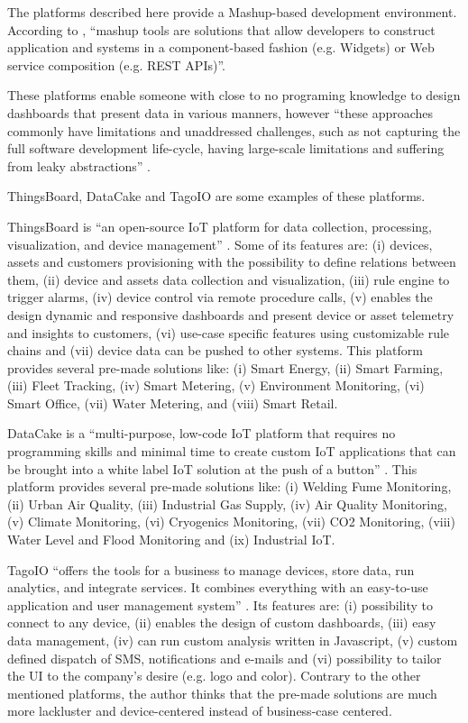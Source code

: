 The platforms described here provide a Mashup-based development environment. According to \cite{DIAS2022100529}, ``mashup tools are solutions that allow developers to construct application and systems in a component-based fashion (e.g. Widgets) or Web service composition (e.g. REST APIs)''.

These platforms enable someone with close to no programing knowledge to design dashboards that present data in various manners, however ``these approaches commonly have limitations and unaddressed challenges, such as not capturing the full software development life-cycle, having large-scale limitations and suffering from leaky abstractions'' \parencite{DIAS2022100529}.

ThingsBoard, DataCake and TagoIO are some examples of these platforms.

ThingsBoard is ``an open-source IoT platform for data collection, processing, visualization, and device management'' \parencite{thingsboard}. Some of its features are: (i) devices, assets and customers provisioning with the possibility to define relations between them, (ii) device and assets data collection and visualization, (iii) rule engine to trigger alarms, (iv) device control via remote procedure calls, (v) enables the design dynamic and responsive dashboards and present device or asset telemetry and insights to customers, (vi) use-case specific features using customizable rule chains and (vii) device data can be pushed to other systems.
This platform provides several pre-made solutions like: (i) Smart Energy, (ii) Smart Farming, (iii) Fleet Tracking, (iv) Smart Metering, (v) Environment Monitoring, (vi) Smart Office, (vii) Water Metering, and (viii) Smart Retail.

DataCake is a ``multi-purpose, low-code \gls{IoT} platform that requires no programming skills and minimal time to create custom \gls{IoT} applications that can be brought into a white label \gls{IoT} solution at the push of a button'' \parencite{datacake}.
This platform provides several pre-made solutions like: (i) Welding Fume Monitoring, (ii) Urban Air Quality, (iii) Industrial Gas Supply, (iv) Air Quality Monitoring, (v) Climate Monitoring, (vi) Cryogenics Monitoring, (vii) CO2 Monitoring, (viii) Water Level and Flood Monitoring and (ix) Industrial \gls{IoT}.

TagoIO ``offers the tools for a business to manage devices, store data, run analytics, and integrate services. It combines everything with an easy-to-use application and user management system'' \parencite{tagoio}. Its features are: (i) possibility to connect to any device, (ii) enables the design of custom dashboards, (iii) easy data management, (iv) can run custom analysis written in Javascript, (v) custom defined dispatch of SMS, notifications and e-mails and (vi) possibility to tailor the \gls{UI} to the company's desire (e.g. logo and color). Contrary to the other mentioned platforms, the author thinks that the pre-made solutions are much more lackluster and device-centered instead of business-case centered.

